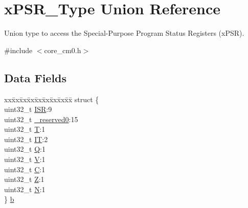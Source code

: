 \hypertarget{unionx_p_s_r___type}{\section{x\-P\-S\-R\-\_\-\-Type Union Reference}
\label{unionx_p_s_r___type}
}


Union type to access the Special-\/\-Purpose Program Status Registers (x\-P\-S\-R).  




{\ttfamily \#include $<$core\-\_\-cm0.\-h$>$}

\subsection*{Data Fields}
\begin{DoxyCompactItemize}
\item 
\begin{tabbing}
xx\=xx\=xx\=xx\=xx\=xx\=xx\=xx\=xx\=\kill
struct \{\\
\>uint32\_t \hyperlink{unionx_p_s_r___type_ad502ba7dbb2aab5f87c782b28f02622d}{ISR}:9\\
\>uint32\_t \hyperlink{unionx_p_s_r___type_ac8a6a13838a897c8d0b8bc991bbaf7c1}{\_reserved0}:15\\
\>uint32\_t \hyperlink{unionx_p_s_r___type_a6e1cf12e53a20224f6f62c001d9be972}{T}:1\\
\>uint32\_t \hyperlink{unionx_p_s_r___type_a76485660fe8ad98cdc71ddd7cb0ed777}{IT}:2\\
\>uint32\_t \hyperlink{unionx_p_s_r___type_a65f27ddc4f7e09c14ce7c5211b2e000a}{Q}:1\\
\>uint32\_t \hyperlink{unionx_p_s_r___type_acd4a2b64faee91e4a9eef300667fa222}{V}:1\\
\>uint32\_t \hyperlink{unionx_p_s_r___type_a7a1caf92f32fe9ebd8d1fe89b06c7776}{C}:1\\
\>uint32\_t \hyperlink{unionx_p_s_r___type_a5ae954cbd9986cd64625d7fa00943c8e}{Z}:1\\
\>uint32\_t \hyperlink{unionx_p_s_r___type_abae0610bc2a97bbf7f689e953e0b451f}{N}:1\\
\} \hyperlink{unionx_p_s_r___type_a8d8c45d946ef8df11f4cac72c667e98b}{b}\\


\end{tabbing}
\end{DoxyCompactItemize}
